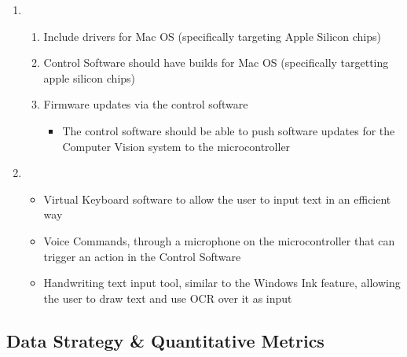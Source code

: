 \documentclass{article}
\newlength\tindent
\begin{document}
\begin{enumerate}[label=\textbf{P\arabic*},leftmargin=\tindent,start=0]
\item ~
    \begin{enumerate}[label=Req \arabic*.,leftmargin=\tindent,align=left,labelwidth=\tindent]
    \item Include drivers for Mac OS (specifically targeting Apple Silicon chips)
    \item Control Software should have builds for Mac OS (specifically targetting apple silicon chips)
    \item Firmware updates via the control software
        \begin{itemize}
        \item The control software should be able to push software updates for the Computer Vision system to the microcontroller
        \end{itemize}
    \end{enumerate}
\item ~
    \begin{itemize}
      \item Virtual Keyboard software to allow the user to input text in an efficient way
      \item Voice Commands, through a microphone on the microcontroller that can trigger an action in the Control Software
      \item Handwriting text input tool, similar to the Windows Ink feature, allowing the user to draw text and use OCR over it as input
    \end{itemize}
\end{enumerate}

\subsection{Data Strategy \& Quantitative Metrics}
\end{document}
